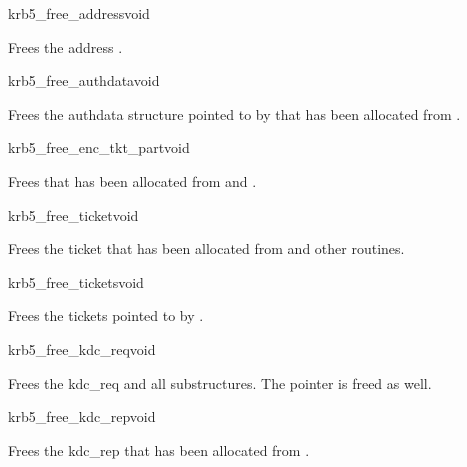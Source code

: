 \begin{funcdecl}{krb5_free_address}{void}{\funcinout}
\end{funcdecl}

Frees the address .

\begin{funcdecl}{krb5_free_authdata}{void}{\funcinout}
\end{funcdecl}

Frees the authdata structure pointed to by  that has been
allocated from 
. 

\begin{funcdecl}{krb5_free_enc_tkt_part}{void}{\funcinout}
\end{funcdecl}

Frees  that has been allocated from
 and .

\begin{funcdecl}{krb5_free_ticket}{void}{\funcinout}
\end{funcdecl}

Frees the ticket  that has been allocated from
 and other routines.

\begin{funcdecl}{krb5_free_tickets}{void}{\funcinout}
\end{funcdecl}

Frees the tickets pointed to by .

\begin{funcdecl}{krb5_free_kdc_req}{void}{\funcinout}
\end{funcdecl}

Frees the kdc_req  and all substructures. The pointer
 is freed as well.

\begin{funcdecl}{krb5_free_kdc_rep}{void}{\funcinout}
\end{funcdecl}

Frees the kdc_rep  that has been allocated from
. 

